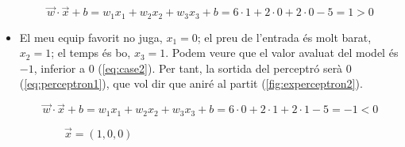 \begin{refsection}
\begin{itemize}
		      \begin{equation}
			      \label{eq:case1}
			      \vec{w}\cdot\vec{x}+b=
			      w_1x_1+w_2x_2+w_3x_3+b=
			      6\cdot1+2\cdot0+2\cdot0-5=1>0
		      \end{equation}

		\item El meu equip favorit no juga, $x_1=0$; el preu de l'entrada és molt barat, $x_2=1$; el temps és bo, $x_3=1$. Podem veure que el valor avaluat del model és $-1$, inferior a $0$ (\cref{eq:case2}). Per tant, la sortida del perceptró serà $0$ (\cref{eq:perceptron1}), que vol dir que aniré al partit (\cref{fig:experceptron2}).

		      \begin{equation}
			      \label{eq:case2}
			      \vec{w}\cdot\vec{x}+b=
			      w_1x_1+w_2x_2+w_3x_3+b=
			      6\cdot0+2\cdot1+2\cdot1-5=-1<0
		      \end{equation}

	\end{itemize}

	\begin{figure}[H]
		\centering
		\begin{subfigure}[t]{0.5\textwidth}
			\centering
			\caption{$\vec{x}=(1,0,0)$}
			\label{fig:experceptron1}
		\end{subfigure}%
		\begin{subfigure}[t]{0.5\textwidth}
			\centering
\end{subfigure}
\end{figure}
\end{refsection}

